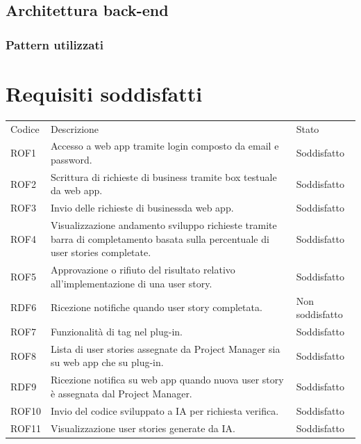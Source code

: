 \documentclass{article}
\begin{document}
{\subsection{Architettura back-end}
\subsubsection{Pattern utilizzati}


\section{Requisiti soddisfatti}
\begin{center}
    \begin{tabular}{|P{2cm}| P{10cm}| P{4cm}|}
\hline
Codice & Descrizione & Stato  \\ 
\hline
ROF1 & Accesso a web app tramite login composto da email e password. & Soddisfatto \\ 
\hline
ROF2& Scrittura di richieste di business tramite box testuale da web app. & Soddisfatto\\ 
\hline
ROF3& Invio delle richieste di businessda web app. & Soddisfatto\\
\hline
{}
ROF4& Visualizzazione andamento sviluppo richieste tramite barra di completamento basata sulla percentuale di user stories completate. & Soddisfatto\\
\hline
ROF5 & Approvazione o rifiuto del risultato relativo all'implementazione di una user story. & Soddisfatto \\
\hline
{}
RDF6&  Ricezione notifiche quando user story completata. & Non soddisfatto\\
\hline
{}
\hline
ROF7&  Funzionalità di tag nel plug-in.  & Soddisfatto\\
\hline
{}
ROF8 & Lista di user stories assegnate da Project Manager sia su web app che su plug-in. & Soddisfatto \\
\hline
{}
RDF9 & Ricezione notifica su web app quando nuova user story è assegnata dal Project Manager. & Soddisfatto\\
\hline
{}
ROF10 & Invio del codice sviluppato a IA per richiesta verifica.& Soddisfatto\\
\hline
{}
ROF11 & Visualizzazione user stories generate da IA.  &Soddisfatto\\

\end{tabular}
\end{center}}
\end{document}
